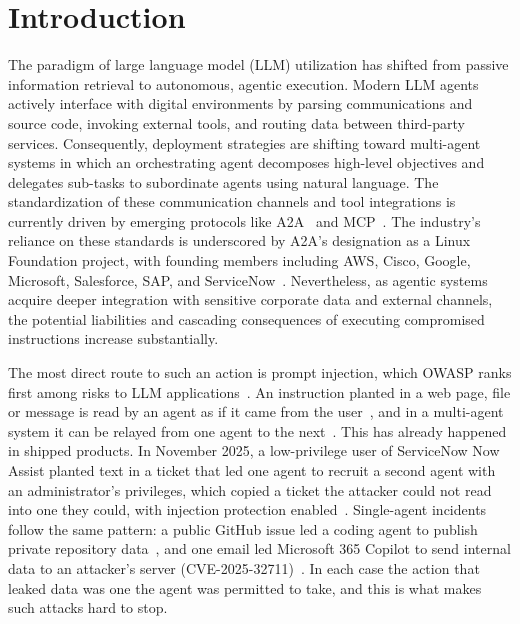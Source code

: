 \documentclass[conference,compsoc]{IEEEtran}
\begin{document}
\section{Introduction}\label{sec:1}
The paradigm of large language model (LLM) utilization has shifted from passive information retrieval to autonomous, agentic execution. Modern LLM agents actively interface with digital environments by parsing communications and source code, invoking external tools, and routing data between third-party services. Consequently, deployment strategies are shifting toward multi-agent systems in which an orchestrating agent decomposes high-level objectives and delegates sub-tasks to subordinate agents using natural language. The standardization of these communication channels and tool integrations is currently driven by emerging protocols like A2A~\cite{a2a2025} and MCP~\cite{mcp2024}. The industry's reliance on these standards is underscored by A2A's designation as a Linux Foundation project, with founding members including AWS, Cisco, Google, Microsoft, Salesforce, SAP, and ServiceNow~\cite{googlecloud2025a2alf}. Nevertheless, as agentic systems acquire deeper integration with sensitive corporate data and external channels, the potential liabilities and cascading consequences of executing compromised instructions increase substantially.

The most direct route to such an action is prompt injection, which OWASP ranks first among risks to LLM applications~\cite{owasp2025llm01}. An instruction planted in a web page, file or message is read by an agent as if it came from the user~\cite{greshake2023}, and in a multi-agent system it can be relayed from one agent to the next~\cite{lee2024promptinfection,triedman2025}. This has already happened in shipped products. In November 2025, a low-privilege user of ServiceNow Now Assist planted text in a ticket that led one agent to recruit a second agent with an administrator's privileges, which copied a ticket the attacker could not read into one they could, with injection protection enabled~\cite{costello2025appomni}. Single-agent incidents follow the same pattern: a public GitHub issue led a coding agent to publish private repository data~\cite{invariant2025github}, and one email led Microsoft 365 Copilot to send internal data to an attacker's server (CVE-2025-32711)~\cite{reddy2025echoleak}. In each case the action that leaked data was one the agent was permitted to take, and this is what makes such attacks hard to stop.
\end{document}
